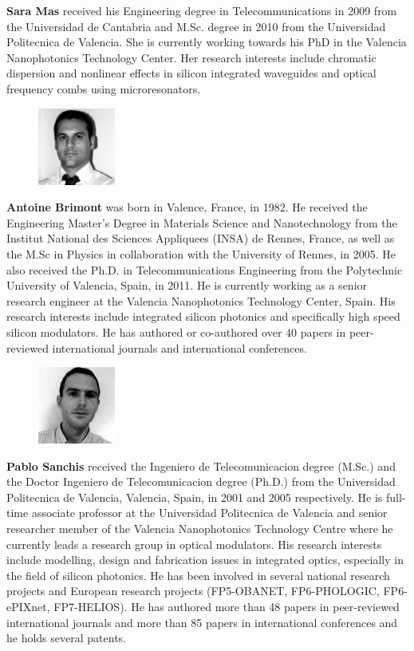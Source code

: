 \documentclass[journal]{IEEEtran}
\newcommand{\extraSpace}{\vspace{30pt}}
\begin{document}
\textbf{Sara Mas} received his Engineering degree in Telecommunications in 2009 from the Universidad de Cantabria and M.Sc. degree in 2010 from the Universidad Politecnica de Valencia. She is currently working towards his PhD in the Valencia Nanophotonics Technology Center. Her research interests include chromatic dispersion and nonlinear effects in silicon integrated waveguides and optical frequency combs using microresonators.
\extraSpace



\begin{figure}
\includegraphics[width=1in]{antoine}
\end{figure}
\textbf{Antoine Brimont} was born in Valence, France, in 1982. He received the Engineering Master's Degree in Materials Science and Nanotechnology from the Institut National des Sciences Appliquees (INSA) de Rennes, France, as well as the M.Sc in Physics in collaboration with the University of Rennes, in 2005. He also received the Ph.D. in Telecommunications Engineering from the Polytechnic University of Valencia, Spain, in 2011. He is currently working as a senior research engineer at the Valencia Nanophotonics Technology Center, Spain. His research interests include integrated silicon photonics and specifically high speed silicon modulators. He has authored or co-authored over 40 papers in peer-reviewed international journals and international conferences.
\extraSpace

\begin{figure}
\includegraphics[width=1in]{pablo}
\end{figure}

\textbf{Pablo Sanchis} received the Ingeniero de Telecomunicacion degree (M.Sc.) and the Doctor Ingeniero de Telecomunicacion degree (Ph.D.) from the Universidad Politecnica de Valencia, Valencia, Spain, in 2001 and 2005 respectively. He is full-time associate professor at the Universidad Politecnica de Valencia and senior researcher member of the Valencia Nanophotonics Technology Centre where he currently leads a research group in optical modulators. His research interests include modelling, design and fabrication issues in integrated optics, especially in the field of silicon photonics. He has been involved in several national research projects and European research projects (FP5-OBANET, FP6-PHOLOGIC, FP6-ePIXnet, FP7-HELIOS). He has authored more than 48 papers in peer-reviewed international journals and more than 85 papers in international conferences and he holds several patents.
\extraSpace
\end{document}
